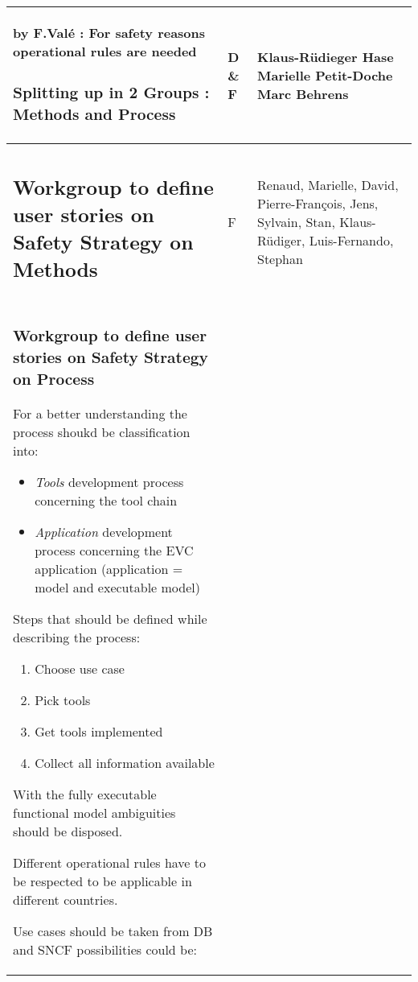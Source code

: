 \documentclass[a4paper]{article}
\newcommand{\C}[2]{\newline{\textbf{Comment}}
	\ifthenelse{\isempty{#1}}%
    	{}%
    	{by #1}%
    : #2}
\begin{document}
\begin{longtable}{|p{}|p{}|p{}|}
\C{F.Val\'{e}}{For safety reasons operational rules are needed}

\subsubsection{Splitting up in 2 Groups : Methods and Process} %

& D \& F
& Klaus-R\"{u}dieger Hase
\newline
Marielle Petit-Doche 
\newline
Marc Behrens

\\\hline
\subsection{Workgroup to define user stories on Safety Strategy on Methods} %
& F
& Renaud, Marielle, David, Pierre-Fran\c{c}ois, Jens, Sylvain, Stan, Klaus-R\"{u}diger, Luis-Fernando, Stephan
\\\hline

\subsubsection{Workgroup to define user stories on Safety Strategy on Process} %


For a better understanding the process shoukd be classification into:
\begin{itemize}
\item \emph{Tools} development process concerning the tool chain
\item \emph{Application} development process concerning the EVC application (application = model and executable model)
\end{itemize}

Steps that should be defined while describing the process:
\begin{enumerate}
\item Choose use case
\item Pick tools
\item Get tools implemented
\item Collect all information available
\end{enumerate}


With the fully executable functional model ambiguities should be disposed.

Different operational rules have to be respected to be applicable in different countries.

Use cases should be taken from DB and SNCF
possibilities could be:


\end{longtable}
\end{document}
